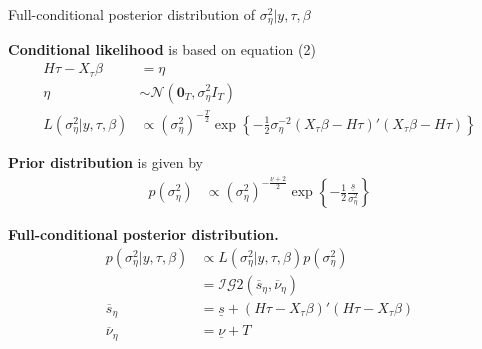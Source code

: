\documentclass[notes,blackandwhite,mathsans,usenames,dvipsnames]{beamer}
\begin{document}
\begin{frame}{Full-conditional posterior distribution of $\sigma^2_\eta|y,\tau,\beta$}

\small
\bigskip\textbf{Conditional likelihood} {\color{mcxs2}is based on equation} (2)
\begin{align*}
H\tau-X_\tau \beta&=\eta\\
\eta  &\sim\mathcal{N}\left(\mathbf{0}_T, \sigma^2_\eta I_T\right)\\
L\left(\sigma^2_\eta|y,\tau,\beta\right)&\propto\left(\sigma^2_\eta\right)^{-\frac{T}{2}}\exp\left\{-\frac{1}{2}\sigma^{-2}_\eta\left(X_\tau \beta - H\tau\right)'\left(X_\tau \beta - H\tau\right)  \right\}
\end{align*}

\smallskip\textbf{Prior distribution} {\color{mcxs2}is given by}
\begin{align*}
p\left(\sigma^2_\eta\right)&\propto\left(\sigma^2_\eta\right)^{-\frac{\underline{\nu}+2}{2}} \exp\left\{ -\frac{1}{2}\frac{\underline{s}}{\sigma^2_\eta} \right\}
\end{align*}

\smallskip\textbf{Full-conditional posterior distribution.}
\begin{align*}
p\left( \sigma^2_\eta|y,\tau,\beta \right) &\propto L\left(\sigma^2_\eta|y,\tau,\beta\right)p\left(\sigma^2_\eta\right)\\
&= \mathcal{IG}2\left(\overline{s}_\eta,\overline{\nu}_\eta\right)\\
\overline{s}_\eta &= \underline{s} + (H\tau-X_\tau \beta)'(H\tau-X_\tau \beta)\\
\overline{\nu}_\eta &= \underline{\nu} + T
\end{align*}

\end{frame}
\end{document}
